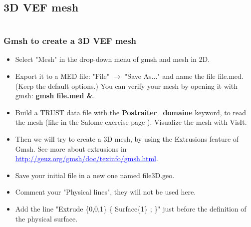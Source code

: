 \documentclass[10pt, hyperref={unicode=true,pdfusetitle, bookmarks=true,bookmarksnumbered=false,bookmarksopen=false, breaklinks=false,pdfborder={0 0l 1},backref=true,colorlinks=true,linkcolor=darkblue,pageanchor}]{beamer}
\begin{document}
\subsection{3D VEF mesh}
\begin{frame}
\begin{small}
\begin{columns}[c] 
\tableofcontents[sections={1-8},currentsection, currentsubsection]
\tableofcontents[sections={9-16},currentsection, currentsubsection]
\end{columns}
\end{small}
\end{frame}
\begin{frame}
\frametitle{Gmsh to create a 3D VEF mesh}
\begin{block}{}

\begin{itemize}
\item Select "Mesh" in the drop-down menu of gmsh and mesh in 2D.
\item Export it to a MED file: "File" $\rightarrow$ "Save As..." and name the file file.med. (Keep the default options.) You can verify your mesh by opening it with gmsh: \textbf{gmsh file.med \&}.
\item Build a TRUST data file with the \textbf{Postraiter\_domaine} keyword, to read the mesh (like in the Salome exercise page \pageref{read_mesh}). Visualize the mesh with VisIt.
\item Then we will try to create a 3D mesh, by using the Extrusions feature of Gmsh. See more about extrusions in \textcolor{blue}{\underline{http://geuz.org/gmsh/doc/texinfo/gmsh.html}}.
\item Save your initial file in a new one named file3D.geo.
\item Comment your "Physical lines", they will not be used here.
\item Add the line "Extrude \{0,0,1\} \{ Surface\{1\} ; \}" just before the definition of the physical surface.
\end{itemize}

\end{block}
\end{frame}
\end{document}
